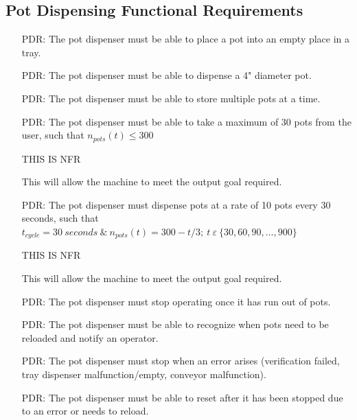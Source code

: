 \documentclass[12pt]{article}
\newcounter{pdreqnum} %
\begin{document}
\subsection{Pot Dispensing Functional Requirements}

\noindent \begin{itemize}

\item[PDR\refstepcounter{pdreqnum}\thepdreqnum \label{R_Pot}:] {The pot dispenser must
    be able to place a pot into an empty place in a tray.}

\item[PDR\refstepcounter{pdreqnum}\thepdreqnum \label{R_Pot}:] {The pot dispenser must
    be able to dispense a 4" diameter pot.}

\item[PDR\refstepcounter{pdreqnum}\thepdreqnum \label{R_Pot}:] {The pot dispenser must
    be able to store multiple pots at a time.}

\item[PDR\refstepcounter{pdreqnum}\thepdreqnum \label{R_Pot}:] {The pot dispenser must 
    be able to take a maximum of 30 pots from the user, such that 
    $n_{pots}(t)\le300$} 
    
THIS IS NFR

This will allow the machine to meet the output goal required.

\item[PDR\refstepcounter{pdreqnum}\thepdreqnum \label{R_Pot}:] {The pot dispenser must 
    dispense pots at a rate of 10 pots every 30 seconds, such that $t_{cycle}=30\ seconds
    \ \&\ n_{pots}\left(t\right)=300-t/3;\ t\ \varepsilon\ \{30, 60, 90, ..., 900\}$}

THIS IS NFR

This will allow the machine to meet the output goal required.

\item[PDR\refstepcounter{pdreqnum}\thepdreqnum \label{R_Pot}:] {The pot dispenser must
    stop operating once it has run out of pots.}

\item[PDR\refstepcounter{pdreqnum}\thepdreqnum \label{R_Pot}:] {The pot dispenser must
    be able to recognize when pots need to be reloaded and notify an operator.}

\item[PDR\refstepcounter{pdreqnum}\thepdreqnum \label{R_Pot}:] {The pot dispenser must
    stop when an error arises (verification failed, tray dispenser malfunction/empty, conveyor
    malfunction).}

\item[PDR\refstepcounter{pdreqnum}\thepdreqnum \label{R_Pot}:] {The pot dispenser must
    be able to reset after it has been stopped due to an error or needs to reload.}

\end{itemize}
\end{document}
